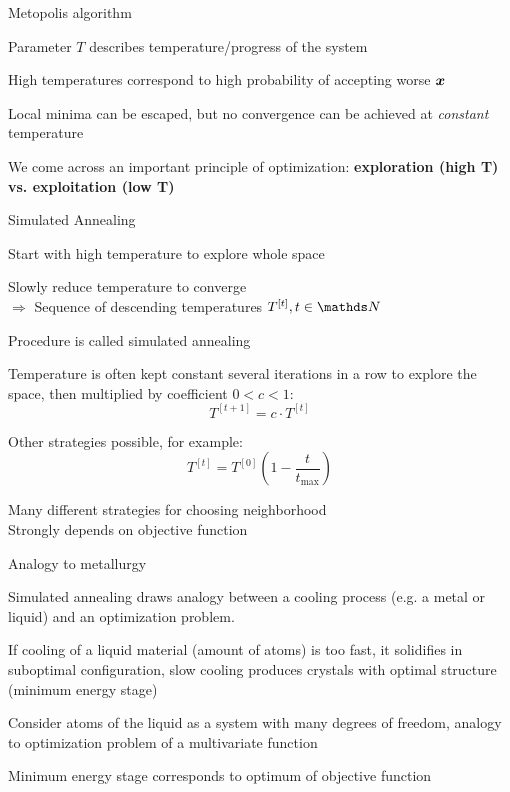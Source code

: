 \documentclass[11pt,compress,t,notes=noshow, xcolor=table]{beamer}
\begin{document}
\begin{framei}{Metopolis algorithm}
\item Parameter $T$ describes temperature/progress of the system
\item High temperatures correspond to high probability of accepting worse $\bm{x}$
\item Local minima can be escaped, but no convergence can be achieved at \textit{constant} temperature
\item We come across an important principle of optimization: \textbf{exploration (high T) vs. exploitation (low T)}
\spacer
{}
\end{framei}


\begin{framei}{Simulated Annealing}
\item Start with high temperature to explore whole space
\item Slowly reduce temperature to converge \\
$\Rightarrow$ Sequence of descending temperatures $T^{[t]}, t \in \N$
\item Procedure is called simulated annealing
\item Temperature is often kept constant several iterations in a row to explore the space, then multiplied by coefficient $0<c<1$:
$$T^{[t+1]} = c \cdot T^{[t]}$$
\item Other strategies possible, for example:
$$T^{[t]} = T^{[0]} \left( 1 - \frac{t}{t_{\text{max}}} \right)$$
\item Many different strategies for choosing neighborhood\\
Strongly depends on objective function
\end{framei}


\begin{framei}[fs=normalsize,sep=L]{Analogy to metallurgy}
\item Simulated annealing draws analogy between a cooling process (e.g. a metal or liquid) and an optimization problem.
\item If cooling of a liquid material (amount of atoms) is too fast, it solidifies in suboptimal configuration, slow cooling produces crystals with optimal structure (minimum energy stage)
\item Consider atoms of the liquid as a system with many degrees of freedom, analogy to optimization problem of a multivariate function
\item Minimum energy stage corresponds to optimum of objective function
\end{framei}


\endlecture
\end{document}
